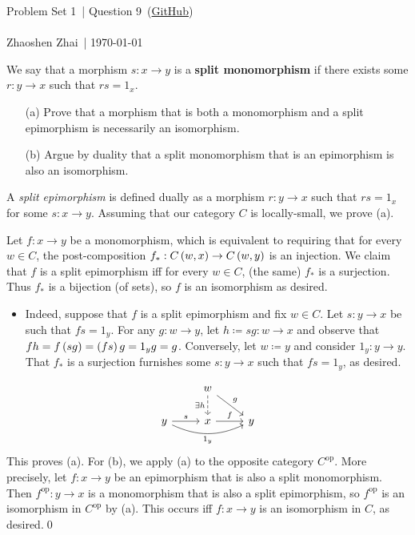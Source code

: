 \documentclass{article}
\begin{document}
    \def\problemSet{1}
    \def\question{9}
    \def\name{Zhaoshen Zhai}

    \begin{center}
        \large{Problem Set \problemSet\ | Question \question\ (\href{https://github.com/zhaoshenzhai/CatTheory-F23}{GitHub})}\\\ \\
        \normalsize{\name\ | \today}
    \end{center}

    \setcounter{exercise}{\question-1}

    \begin{exercise}
        We say that a morphism $s:x\to y$ is a \textbf{split monomorphism} if there exists some $r:y\to x$ such that $rs=1_x$.
        \begin{itemize}
            \item[(a)] Prove that a morphism that is both a monomorphism and a split epimorphism is necessarily an isomorphism.
            \item[(b)] Argue by duality that a split monomorphism that is an epimorphism is also an isomorphism.
        \end{itemize}
    \end{exercise}
    \begin{solution}
        A \textit{split epimorphism} is defined dually as a morphism $r:y\to x$ such that $rs=1_x$ for some $s:x\to y$. Assuming that our category $C$ is locally-small, we prove (a).
        
        Let $f:x\to y$ be a monomorphism, which is equivalent to requiring that for every $w\in C$, the post-composition $f_\ast:C\left(w,x\right)\to C\left(w,y\right)$ is an injection. We claim that $f$ is a split epimorphism iff for every $w\in C$, (the same) $f_\ast$ is a surjection. Thus $f_\ast$ is a bijection (of sets), so $f$ is an isomorphism as desired.
        \begin{itemize}
            \item Indeed, suppose that $f$ is a split epimorphism and fix $w\in C$. Let $s:y\to x$ be such that $fs=1_y$. For any $g:w\to y$, let $h\coloneqq sg:w\to x$ and observe that $fh=f\left(sg\right)=\left(fs\right)g=1_yg=g$. Conversely, let $w\coloneqq y$ and consider $1_y:y\to y$. That $f_\ast$ is a surjection furnishes some $s:y\to x$ such that $fs=1_y$, as desired.
        \end{itemize}
        \begin{equation*}
            \begin{tikzcd}
                & w \ar[dr, "g"] \ar[d, "\ex h"', dashed] & \\
                y \ar[r, "s"] \ar[rr, "1_y"', bend right=25] & x \ar[r, "f"] & y
            \end{tikzcd}
        \end{equation*}
        This proves (a). For (b), we apply (a) to the opposite category $C^\textrm{op}$. More precisely, let $f:x\to y$ be an epimorphism that is also a split monomorphism. Then $f^\textrm{op}:y\to x$ is a monomorphism that is also a split epimorphism, so $f^\textrm{op}$ is an isomorphism in $C^\textrm{op}$ by (a). This occurs iff $f:x\to y$ is an isomorphism in $C$, as desired.\qed
    \end{solution}
\end{document}
